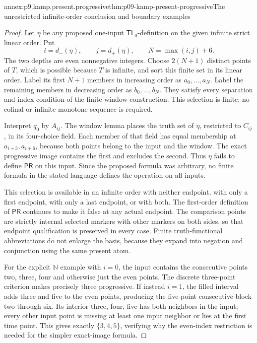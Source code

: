 \begin{annexitem}{annex:p9.kamp.present.progressive}{thm:p09-kamp-present-progressive}{The unrestricted infinite-order conclusion and boundary examples}
\begin{proof}
Let \(\eta\) be any proposed one-input
\(\mathsf{TL}_0\)-definition on the given
infinite strict linear order. Put
\[
 i=d_-(\eta),\qquad j=d_+(\eta),\qquad
 N=\max(i,j)+6.
\]
The two depths are even nonnegative
integers. Choose \(2(N+1)\) distinct
points of \(T\), which is possible
because \(T\) is infinite, and sort
this finite set in its linear order.
Label its first \(N+1\) members in
increasing order as \(a_0,\ldots,a_N\).
Label the remaining members in
decreasing order as \(b_0,\ldots,b_N\).
They satisfy every separation and
index condition of the finite-window
construction. This selection is
finite; no cofinal or infinite
monotone sequence is required.

Interpret \(q_0\) by \(A_{ij}\).
The window lemma places the truth
set of \(\eta\), restricted to
\(C_{ij}\), in its four-choice
field. Each member of that field
has equal membership at
\(a_{i+3},a_{i+6}\), because
both points belong to the input
and the window. The exact
progressive image contains the
first and excludes the second.
Thus \(\eta\) fails to define
\(\mathsf{PR}\) on this input.
Since the proposed formula was
arbitrary, no finite formula
in the stated language defines
the operation on all inputs.

This selection is available in
an infinite order with neither
endpoint, with only a first
endpoint, with only a last
endpoint, or with both. The
first-order definition of
\(\mathsf{PR}\) continues to
make it false at any actual
endpoint. The comparison points
are strictly internal selected
markers with other markers on
both sides, so that endpoint
qualification is preserved in
every case. Finite truth-functional
abbreviations do not enlarge
the basis, because they expand
into negation and conjunction
using the same present atom.

For the explicit \(\mathbb N\)
example with \(i=0\), the
input contains the consecutive
points two, three, four and
otherwise just the even points.
The discrete three-point
criterion makes precisely
three progressive. If instead
\(i=1\), the filled interval
adds three and five to the
even points, producing the
five-point consecutive block
two through six. Its interior
three, four, five has both
neighbors in the input; every
other input point is missing
at least one input neighbor
or lies at the first time
point. This gives exactly
\(\{3,4,5\}\), verifying
why the even-index restriction
is needed for the simpler
exact-image formula.


\end{proof}
\end{annexitem}
